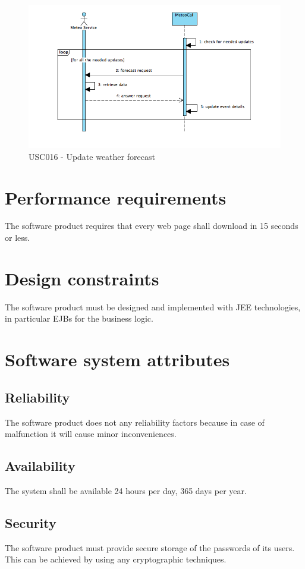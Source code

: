 \documentclass[10pt,a4paper,titlepage]{article}
\begin{document}
\begin{figure}[h]
\centering
\includegraphics[width=\linewidth]{./Sequence_diag/USC016.png}
\caption[USC016]{USC016 - Update weather forecast}
\label{fig:USC016}
\end{figure}

\section{Performance requirements}
The software product requires that every web page shall download in 15 seconds or less.

\section{Design constraints}
The software product must be designed and implemented with JEE technologies, in particular
EJBs for the business logic.

\section{Software system attributes}

\subsection{Reliability}
The software product does not any reliability factors because in case of malfunction it will
cause minor inconveniences.

\subsection{Availability}
The system shall be available 24 hours per day, 365 days per year.

\subsection{Security}
The software product must provide secure storage of the passwords of its users. This can be
achieved by using any cryptographic techniques.
\end{document}
